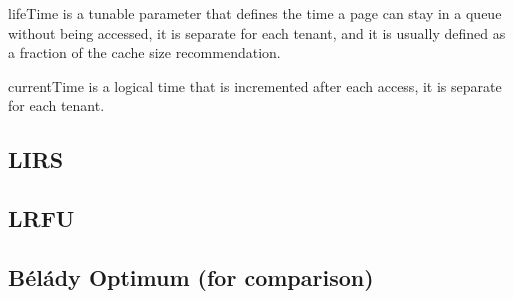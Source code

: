 lifeTime is a tunable parameter that defines the time a page can stay in a queue without being accessed,
it is separate for each tenant, and it is usually defined as a fraction of the cache size recommendation.

currentTime is a logical time that is incremented after each access, it is separate for each tenant.

\subsection{LIRS}


\subsection{LRFU}

\subsection{Bélády Optimum (for comparison)}